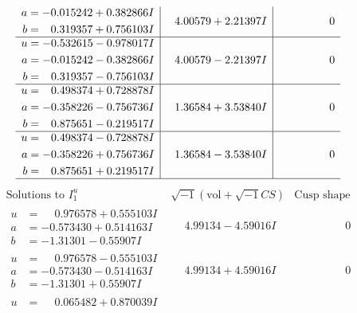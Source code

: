 \documentclass[1p]{elsarticle_modified}
\theoremstyle{definition}
\newcommand{\I}{\sqrt{-1}}
\begin{document}
$$\begin{array}{c|c|c}
\begin{aligned}
a &= -0.015242 + 0.382866 I \\
b &= \phantom{-}0.319357 + 0.756103 I\end{aligned}
 & \phantom{-}4.00579 + 2.21397 I & \phantom{-0.000000 } 0 \\ \hline\begin{aligned}
u &= -0.532615 - 0.978017 I \\
a &= -0.015242 - 0.382866 I \\
b &= \phantom{-}0.319357 - 0.756103 I\end{aligned}
 & \phantom{-}4.00579 - 2.21397 I & \phantom{-0.000000 } 0 \\ \hline\begin{aligned}
u &= \phantom{-}0.498374 + 0.728878 I \\
a &= -0.358226 - 0.756736 I \\
b &= \phantom{-}0.875651 - 0.219517 I\end{aligned}
 & \phantom{-}1.36584 + 3.53840 I & \phantom{-0.000000 } 0 \\ \hline\begin{aligned}
u &= \phantom{-}0.498374 - 0.728878 I \\
a &= -0.358226 + 0.756736 I \\
b &= \phantom{-}0.875651 + 0.219517 I\end{aligned}
 & \phantom{-}1.36584 - 3.53840 I & \phantom{-0.000000 } 0\\
 \hline 
 \end{array}$$\newpage$$\begin{array}{c|c|c}  
\text{Solutions to }I^u_{1}& \I (\text{vol} + \sqrt{-1}CS) & \text{Cusp shape}\\
 \hline 
\begin{aligned}
u &= \phantom{-}0.976578 + 0.555103 I \\
a &= -0.573430 + 0.514163 I \\
b &= -1.31301 - 0.55907 I\end{aligned}
 & \phantom{-}4.99134 - 4.59016 I & \phantom{-0.000000 } 0 \\ \hline\begin{aligned}
u &= \phantom{-}0.976578 - 0.555103 I \\
a &= -0.573430 - 0.514163 I \\
b &= -1.31301 + 0.55907 I\end{aligned}
 & \phantom{-}4.99134 + 4.59016 I & \phantom{-0.000000 } 0 \\ \hline\begin{aligned}
u &= \phantom{-}0.065482 + 0.870039 I \\

\end{aligned}
\end{array}$$
\end{document}
